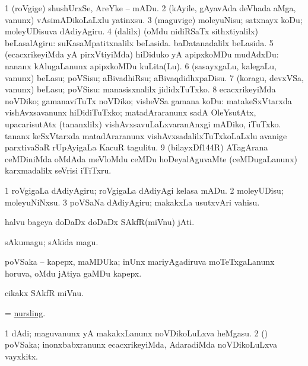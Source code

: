 \bentry
{}
\gl{\sakirx}
\bmng
\bnum
\num{1} (roVgige) shushUrxSe, AreYke -- mADu. 
\num{2} (kAyile, gAyavAda deVhada aMga, \mo vanunx) vAsimADikoLaLxlu yatinxsu. 
\num{3} (maguvige) moleyuNisu; satxnayx koDu; moleyUDisuva dAdiyAgiru. 
\num{4} (\kaparx dalilx) (oMdu nidiRSaTx sithxtiyalilx) beLasalAgiru:  suKasaMpatitxnalilx beLasida.  baDatanadalilx beLasida. 
\num{5} (ecacxrikeyiMda yA pirxVtiyiMda) hiDiduko yA apipxkoMDu mudAdxDu:  nananx kAlugaLanunx apipxkoMDu kuLita(Lu). 
\num{6} (sasayxgaLu, kalegaLu, \mo vanunx) beLasu; poVSisu; aBivadhiRsu; aBivaqdidhxpaDisu. 
\num{7} (koragu, devxVSa, \mo vanunx) beLasu; poVSisu:  manasisxnalilx jididxTuTxko. 
\num{8} ecacxrikeyiMda noVDiko; gamanaviTuTx noVDiko; visheVSa gamana koDu:  matakeSxVtarxda vishAvxsavanunx hiDidiTuTxko; matadAraranunx sadA OleYsutAtx, upacarisutAtx (tananxlilx) vishAvxsavuLaLxvaranAnxgi mADiko, iTuTxko.  tananx keSxVtarxda matadAraranunx vishAvxsadalilxTuTxkoLaLxlu avanige parxtivaSaR  rUpAyigaLa KacuR tagulitu. 
\num{9} (bilayxDf\char144R) ATagArana ceMDiniMda oMdAda meVloMdu ceMDu hoDeyalAguvaMte (ceMDugaLanunx) karxmadalilx seVrisi iTiTxru. 
\enum
\emng

\noindent
\gl{\akirx}
\expl{}
\bmng
\bnum
\num{1} roVgigaLa dAdiyAgiru; roVgigaLa dAdiyAgi kelasa mADu. 
\num{2} moleyUDisu; moleyuNiNxsu. 
\num{3} poVSaNa dAdiyAgiru; makakxLa usutxvAri vahisu. 
\enum
\emng
\eentry

\bentry
{}
\gl{\nA}
\bmng
halvu bageya doDaDx doDaDx SAkfR(miVnu) jAti. 
\emng
\eentry

\bentry
{}
\gl{\nA}
\bmng
sAkumagu; sAkida magu. 
\emng
\eentry

\bentry
{}
\gl{\nA}
\bmng
poVSaka -- kapepx, maMDUka; inUnx mariyAgadiruva moTeTxgaLanunx horuva, oMdu jAtiya gaMDu kapepx. 
\emng
\eentry

\bentry
{}
\gl{\nA}
\bmng
cikakx SAkfR miVnu. 
\emng
\eentry

\bentry
{}
\gl{\nA}
\bmng
= \hyperlink{nursling}{nursling}. 
\emng
\eentry

\bentry
{}
\gl{\nA}
\bmng
\bnum
\num{1} dAdi; maguvanunx yA makakxLanunx noVDikoLuLxva heMgasu. 
\num{2} (\rUpa) poVSaka; inonxbabxranunx ecacxrikeyiMda, AdaradiMda noVDikoLuLxva vayxkitx. 
\enum
\emng
\eentry

